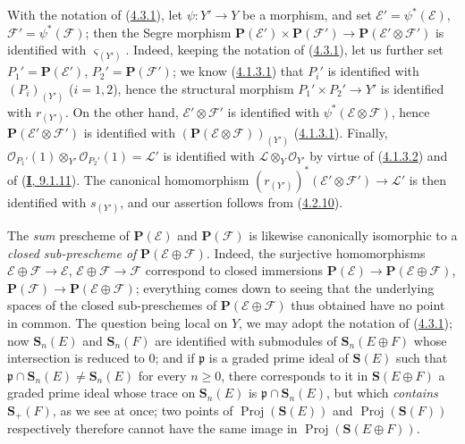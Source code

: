 \begin{env}[4.3.5]
\label{II.4.3.5}
With the notation of (\hyperref[II.4.3.1]{4.3.1}), let
$\psi:Y'\to Y$ be a morphism, and set
$\mathcal{E}'=\psi^*(\mathcal{E})$, $\mathcal{F}'=\psi^*(\mathcal{F})$;
then the Segre morphism
$\mathbf{P}(\mathcal{E}')\times\mathbf{P}(\mathcal{F}')
\to\mathbf{P}(\mathcal{E}'\otimes\mathcal{F}')$ is identified with
$\varsigma_{(Y')}$. Indeed, keeping the notation of
(\hyperref[II.4.3.1]{4.3.1}), let us further set
$P_1'=\mathbf{P}(\mathcal{E}')$, $P_2'=\mathbf{P}(\mathcal{F}')$; we know
(\hyperref[II.4.1.3.1]{4.1.3.1}) that $P_i'$ is identified with $(P_i)_{(Y')}$
($i=1,2$), hence the structural morphism $P_1'\times P_2'\to Y'$ is identified
with $r_{(Y')}$. On the other hand,
$\mathcal{E}'\otimes\mathcal{F}'$ is identified with
$\psi^*(\mathcal{E}\otimes\mathcal{F})$, hence
$\mathbf{P}(\mathcal{E}'\otimes\mathcal{F}')$ is identified with
$(\mathbf{P}(\mathcal{E}\otimes\mathcal{F}))_{(Y')}$
(\hyperref[II.4.1.3.1]{4.1.3.1}). Finally,
$\mathcal{O}_{P_1'}(1)\otimes_{Y'}\mathcal{O}_{P_2'}(1)=\mathcal{L}'$
is identified with $\mathcal{L}\otimes_Y\mathcal{O}_{Y'}$ by virtue of
(\hyperref[II.4.1.3.2]{4.1.3.2}) and of
(\hyperref[I.9.1.11]{\textbf{I}, 9.1.11}). The canonical homomorphism
$(r_{(Y')})^*(\mathcal{E}'\otimes\mathcal{F}')\to\mathcal{L}'$ is then
identified with $s_{(Y')}$, and our assertion follows from
(\hyperref[II.4.2.10]{4.2.10}).
\end{env}

\begin{remark}[4.3.6]
\label{II.4.3.6}
The \emph{sum} prescheme of $\mathbf{P}(\mathcal{E})$ and
$\mathbf{P}(\mathcal{F})$ is likewise canonically isomorphic to a
\emph{closed sub-prescheme of} $\mathbf{P}(\mathcal{E}\oplus\mathcal{F})$.
Indeed, the surjective homomorphisms
$\mathcal{E}\oplus\mathcal{F}\to\mathcal{E}$,
$\mathcal{E}\oplus\mathcal{F}\to\mathcal{F}$ correspond to closed
immersions
$\mathbf{P}(\mathcal{E})\to\mathbf{P}(\mathcal{E}\oplus\mathcal{F})$,
$\mathbf{P}(\mathcal{F})\to\mathbf{P}(\mathcal{E}\oplus\mathcal{F})$;
everything comes down to seeing that the underlying spaces of the closed
sub-preschemes of $\mathbf{P}(\mathcal{E}\oplus\mathcal{F})$ thus obtained have
no point in common. The question being local on $Y$, we may adopt the notation of
(\hyperref[II.4.3.1]{4.3.1}); now $\mathbf{S}_n(E)$ and
$\mathbf{S}_n(F)$ are identified with submodules of
$\mathbf{S}_n(E\oplus F)$ whose intersection is reduced to $0$; and if
$\mathfrak{p}$ is a graded prime ideal of $\mathbf{S}(E)$ such that
$\mathfrak{p}\cap\mathbf{S}_n(E)\neq\mathbf{S}_n(E)$ for every $n\geq0$,
there corresponds to it in $\mathbf{S}(E\oplus F)$ a graded prime ideal whose
trace on $\mathbf{S}_n(E)$ is
$\mathfrak{p}\cap\mathbf{S}_n(E)$, but which \emph{contains} $\mathbf{S}_+(F)$,
as we see at once; two points of
$\operatorname{Proj}(\mathbf{S}(E))$ and
$\operatorname{Proj}(\mathbf{S}(F))$ respectively therefore cannot have
the same image in $\operatorname{Proj}(\mathbf{S}(E\oplus F))$.
\end{remark}


